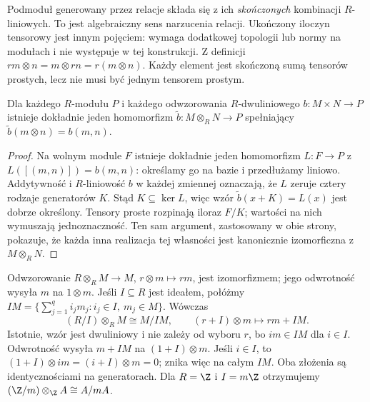 Podmoduł generowany przez relacje składa się
z ich \emph{skończonych} kombinacji $R$-liniowych.
To jest algebraiczny sens narzucenia relacji.
Ukończony iloczyn tensorowy jest innym pojęciem:
wymaga dodatkowej topologii lub normy na modułach
i nie występuje w tej konstrukcji.
Z definicji
$rm\otimes n=m\otimes rn=r(m\otimes n)$.
Każdy element jest skończoną sumą tensorów
prostych, lecz nie musi być jednym tensorem prostym.

\begin{twierdzenie}
\label{thm:tensor-modulow-uniwersalnosc}
Dla każdego $R$-modułu $P$ i każdego
odwzorowania $R$-dwuliniowego
$b:M\times N\to P$ istnieje dokładnie
jeden homomorfizm $\widetilde b:M\otimes_R N\to P$
spełniający $\widetilde b(m\otimes n)=b(m,n)$.
\end{twierdzenie}
\begin{proof}
Na wolnym module $F$ istnieje dokładnie
jeden homomorfizm $L:F\to P$ z
$L([(m,n)])=b(m,n)$: określamy go na bazie
i przedłużamy liniowo. Addytywność i
$R$-liniowość $b$ w każdej zmiennej oznaczają,
że $L$ zeruje cztery rodzaje generatorów $K$.
Stąd $K\subseteq\ker L$, więc wzór
$\widetilde b(x+K)=L(x)$ jest dobrze określony.
Tensory proste rozpinają iloraz $F/K$;
wartości na nich wymuszają jednoznaczność.
Ten sam argument, zastosowany w obie strony,
pokazuje, że każda inna realizacja tej własności
jest kanonicznie izomorficzna z $M\otimes_R N$.
\end{proof}

\begin{przyklad}
\label{prz:tensor-jednostka-ideal}
Odwzorowanie $R\otimes_R M\to M$,
$r\otimes m\mapsto rm$, jest izomorfizmem;
jego odwrotność wysyła $m$ na $1\otimes m$.
Jeśli $I\subseteq R$ jest ideałem, połóżmy
$IM=\{\sum_{j=1}^q i_jm_j:
i_j\in I,\ m_j\in M\}$.
Wówczas
\begin{equation}\label{eq:tensor-ideal-iloraz}
 (R/I)\otimes_R M\cong M/IM,
 \qquad (r+I)\otimes m\longmapsto rm+IM.
\end{equation}
Istotnie, wzór jest dwuliniowy i nie zależy
od wyboru $r$, bo $i m\in IM$ dla $i\in I$.
Odwrotność wysyła $m+IM$ na
$(1+I)\otimes m$. Jeśli $i\in I$, to
$(1+I)\otimes im=(i+I)\otimes m=0$;
znika więc na całym $IM$. Oba złożenia
są identycznościami na generatorach.
Dla $R=\Z$ i $I=m\Z$ otrzymujemy
$(\Z/m)\otimes_{\Z}A\cong A/mA$.
\end{przyklad}

